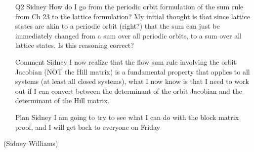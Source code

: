 {\begin{itemize}
\item[Q2 Sidney]
How do I go from the periodic orbit formulation of the sum rule from Ch 23 to the lattice formulation? My initial thought is that since lattice states are akin to a periodic orbit (right?) that the sum can just be immediately changed from a sum over all periodic orbits, to a sum over all lattice states. Is this reasoning correct? 

\item[Comment Sidney]
I now realize that the flow sum rule involving the orbit Jacobian (NOT the Hill matrix) is a fundamental property that applies to all systems (at least all closed systems), what I now know is that I need to work out if I can convert between the determinant of the orbit Jacobian and the determinant of the Hill matrix. 

\item[Plan Sidney]
I am going to try to see what I can do with the block matrix proof, and I will get back to everyone on Friday
\end{itemize}
\hfill (Sidney Williams) %
    } %
